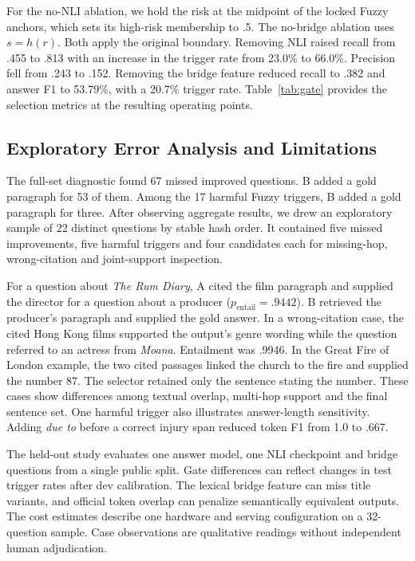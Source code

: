 For the no-NLI ablation, we hold the risk at the midpoint of the locked Fuzzy anchors, which sets its high-risk membership to .5. The no-bridge ablation uses $s=h(r)$. Both apply the original boundary. Removing NLI raised recall from .455 to .813 with an increase in the trigger rate from 23.0\% to 66.0\%. Precision fell from .243 to .152. Removing the bridge feature reduced recall to .382 and answer F1 to 53.79\%, with a 20.7\% trigger rate. Table~\ref{tab:gate} provides the selection metrics at the resulting operating points.

\subsection{Exploratory Error Analysis and Limitations}
The full-set diagnostic found 67 missed improved questions. B added a gold paragraph for 53 of them. Among the 17 harmful Fuzzy triggers, B added a gold paragraph for three. After observing aggregate results, we drew an exploratory sample of 22 distinct questions by stable hash order. It contained five missed improvements, five harmful triggers and four candidates each for missing-hop, wrong-citation and joint-support inspection.

For a question about \emph{The Rum Diary}, A cited the film paragraph and supplied the director for a question about a producer ($p_\mathrm{entail}=.9442$). B retrieved the producer's paragraph and supplied the gold answer. In a wrong-citation case, the cited Hong Kong films supported the output's genre wording while the question referred to an actress from \emph{Moana}. Entailment was .9946. In the Great Fire of London example, the two cited passages linked the church to the fire and supplied the number 87. The selector retained only the sentence stating the number. These cases show differences among textual overlap, multi-hop support and the final sentence set. One harmful trigger also illustrates answer-length sensitivity. Adding \textit{due to} before a correct injury span reduced token F1 from 1.0 to .667.

The held-out study evaluates one answer model, one NLI checkpoint and bridge questions from a single public split. Gate differences can reflect changes in test trigger rates after dev calibration. The lexical bridge feature can miss title variants, and official token overlap can penalize semantically equivalent outputs. The cost estimates describe one hardware and serving configuration on a 32-question sample. Case observations are qualitative readings without independent human adjudication.
